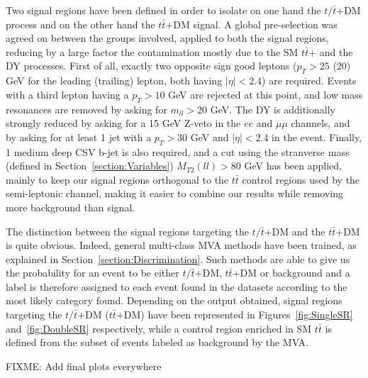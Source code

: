 \documentclass[a4paper, 10pt, openright]{report}
\begin{document}
Two signal regions have been defined in order to isolate on one hand the $t/ \bar t$+DM process and on the other hand the $t \bar t$+DM signal. A global pre-selection was agreed on between the groups involved, applied to both the signal regions, reducing by a large factor the contamination mostly due to the \ac{SM} $t \bar t$+ and the \ac{DY} processes. First of all, exactly two opposite sign good leptons ($p_T > 25$ ($20$) GeV for the leading (trailing) lepton, both having $|\eta| < 2.4$) are required. Events with a third lepton having a $p_T > 10$ GeV are rejected at this point, and low mass resonances are removed by asking for $m_{ll} > 20$ GeV. The \ac{DY} is additionally strongly reduced by asking for a 15 GeV Z-veto in the $ee$ and $\mu \mu$ channels, and by asking for at least 1 jet with a $p_T > 30$ GeV and $|\eta| < 2.4$ in the event. Finally, 1 medium deep CSV b-jet is also required, and a cut using the stranverse mass (defined in Section~\ref{section:Variables}) $M_{T2}(ll) > 80$ GeV has been applied, mainly to keep our signal regions orthogonal to the $t \bar t$ control regions used by the semi-leptonic channel, making it easier to combine our results while removing more background than signal.

The distinction between the signal regions targeting the $t/\bar t$+DM and the $t \bar t$+DM is quite obvious. Indeed, general multi-class \ac{MVA} methods have been trained, as explained in Section~\ref{section:Discrimination}. Such methods are able to give us the probability for an event to be either $t/\bar t$+DM, $t \bar t$+DM or background and a label is therefore assigned to each event found in the datasets according to the most likely category found. Depending on the output obtained, signal regions targeting the $t/\bar t$+DM ($t \bar t$+DM) have been represented in Figures~\ref{fig:SingleSR} and~\ref{fig:DoubleSR} respectively, while a control region enriched in \ac{SM} $t \bar t$ is defined from the subset of events labeled as background by the \ac{MVA}.

\color{red}FIXME: Add final plots everywhere \color{black}
\end{document}
